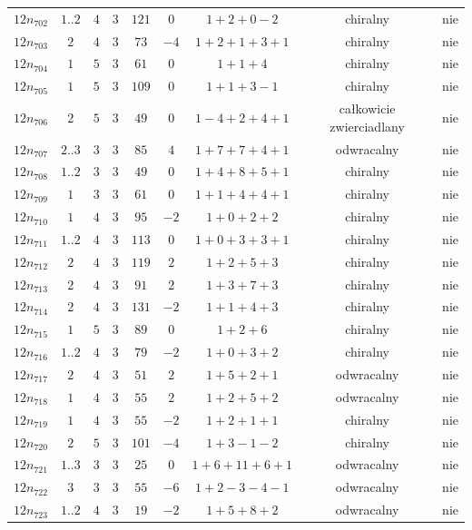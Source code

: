 \begin{longtable}{ccccccccc}
$12n_{702}$ & $1..2$ & $4$ & $3$ & $121$ & $0$ & $1+2+0-2$ & chiralny & nie \\
$12n_{703}$ & $2$ & $4$ & $3$ & $73$ & $-4$ & $1+2+1+3+1$ & chiralny & nie \\
$12n_{704}$ & $1$ & $5$ & $3$ & $61$ & $0$ & $1+1+4$ & chiralny & nie \\
$12n_{705}$ & $1$ & $5$ & $3$ & $109$ & $0$ & $1+1+3-1$ & chiralny & nie \\
$12n_{706}$ & $2$ & $5$ & $3$ & $49$ & $0$ & $1-4+2+4+1$ & całkowicie zwierciadlany & nie \\
$12n_{707}$ & $2..3$ & $3$ & $3$ & $85$ & $4$ & $1+7+7+4+1$ & odwracalny & nie \\
$12n_{708}$ & $1..2$ & $3$ & $3$ & $49$ & $0$ & $1+4+8+5+1$ & chiralny & nie \\
$12n_{709}$ & $1$ & $3$ & $3$ & $61$ & $0$ & $1+1+4+4+1$ & chiralny & nie \\
$12n_{710}$ & $1$ & $4$ & $3$ & $95$ & $-2$ & $1+0+2+2$ & chiralny & nie \\
$12n_{711}$ & $1..2$ & $4$ & $3$ & $113$ & $0$ & $1+0+3+3+1$ & chiralny & nie \\
$12n_{712}$ & $2$ & $4$ & $3$ & $119$ & $2$ & $1+2+5+3$ & chiralny & nie \\
$12n_{713}$ & $2$ & $4$ & $3$ & $91$ & $2$ & $1+3+7+3$ & chiralny & nie \\
$12n_{714}$ & $2$ & $4$ & $3$ & $131$ & $-2$ & $1+1+4+3$ & chiralny & nie \\
$12n_{715}$ & $1$ & $5$ & $3$ & $89$ & $0$ & $1+2+6$ & chiralny & nie \\
$12n_{716}$ & $1..2$ & $4$ & $3$ & $79$ & $-2$ & $1+0+3+2$ & chiralny & nie \\
$12n_{717}$ & $2$ & $4$ & $3$ & $51$ & $2$ & $1+5+2+1$ & odwracalny & nie \\
$12n_{718}$ & $1$ & $4$ & $3$ & $55$ & $2$ & $1+2+5+2$ & odwracalny & nie \\
$12n_{719}$ & $1$ & $4$ & $3$ & $55$ & $-2$ & $1+2+1+1$ & chiralny & nie \\
$12n_{720}$ & $2$ & $5$ & $3$ & $101$ & $-4$ & $1+3-1-2$ & chiralny & nie \\
$12n_{721}$ & $1..3$ & $3$ & $3$ & $25$ & $0$ & $1+6+11+6+1$ & odwracalny & nie \\
$12n_{722}$ & $3$ & $3$ & $3$ & $55$ & $-6$ & $1+2-3-4-1$ & odwracalny & nie \\
$12n_{723}$ & $1..2$ & $4$ & $3$ & $19$ & $-2$ & $1+5+8+2$ & odwracalny & nie \\

\end{longtable}
